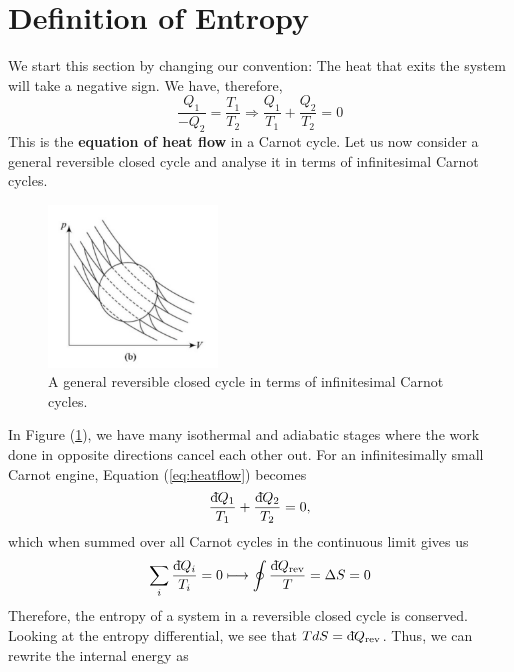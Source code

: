     \section{Definition of Entropy}
    \label{sec:2.2Definitionofentropy}
        We start this section by changing our convention: The heat that exits the system will take a negative sign. We have, therefore,
        \begin{equation}
            \frac{Q_1}{-Q_2} = \frac{T_1}{T_2} \Rightarrow \frac{Q_1}{T_1} + \frac{Q_2}{T_2} = 0
            \label{eq:heatflow}
        \end{equation}
        This is the \textbf{equation of heat flow} in a Carnot cycle. Let us now consider a general reversible closed cycle and analyse it in terms of infinitesimal Carnot cycles. 
        \begin{figure}[H]
            \centering
            \includegraphics[width = 0.4\textwidth]{Entropy_Carnot.png}
            \caption{A general reversible closed cycle in terms of infinitesimal Carnot cycles.}
            \label{fig:generalcycle}
        \end{figure}
        In Figure (\ref{fig:generalcycle}), we have many isothermal and adiabatic stages where the work done in opposite directions cancel each other out. For an infinitesimally small Carnot engine, Equation (\ref{eq:heatflow}) becomes
        \begin{equation}
            \frac{\text{d}\hspace*{-0.13em}\bar{}\hspace*{0.1em} Q_1}{T_1} + \frac{\text{d}\hspace*{-0.13em}\bar{}\hspace*{0.1em} Q_2}{T_2} = 0,
        \end{equation}
        which when summed over all Carnot cycles in the continuous limit gives us
        \begin{equation}
            \sum_i\frac{\text{d}\hspace*{-0.13em}\bar{}\hspace*{0.1em} Q_i}{T_i} = 0 \longmapsto \oint\frac{\text{d}\hspace*{-0.13em}\bar{}\hspace*{0.1em} Q_\text{rev}}{T} = \Delta S = 0
        \end{equation}
        Therefore, the entropy of a system in a reversible closed cycle is conserved.\\
        Looking at the entropy differential, we see that $TdS = \text{d}\hspace*{-0.13em}\bar{}\hspace*{0.1em} Q_\text{rev}$. Thus, we can rewrite the internal energy as
